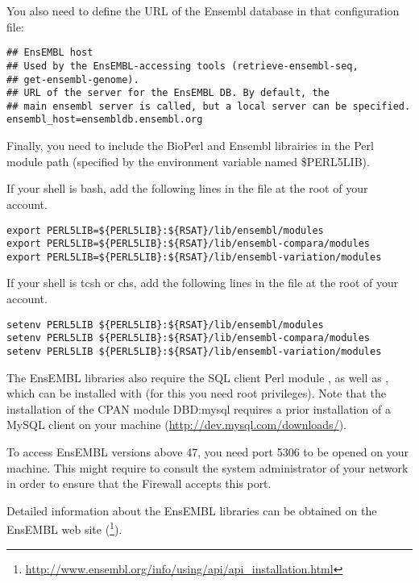 \documentclass[12pt,a4paper, oneside]{scrreprt} %
\begin{document}
You also need to define the URL of the Ensembl database in that
configuration file:

\begin{lstlisting}
## EnsEMBL host
## Used by the EnsEMBL-accessing tools (retrieve-ensembl-seq,
## get-ensembl-genome).
## URL of the server for the EnsEMBL DB. By default, the
## main ensembl server is called, but a local server can be specified.
ensembl_host=ensembldb.ensembl.org
\end{lstlisting}

Finally, you need to include the BioPerl and Ensembl librairies in the
Perl module path (specified by the environment variable named
\$PERL5LIB).

If your shell is bash, add the following lines in the file
 at the root of your account.

\begin{lstlisting}
export PERL5LIB=${PERL5LIB}:${RSAT}/lib/ensembl/modules
export PERL5LIB=${PERL5LIB}:${RSAT}/lib/ensembl-compara/modules
export PERL5LIB=${PERL5LIB}:${RSAT}/lib/ensembl-variation/modules
\end{lstlisting}

If your shell is tcsh or chs, add the following lines in the file
 at the root of your account.

\begin{lstlisting}
setenv PERL5LIB ${PERL5LIB}:${RSAT}/lib/ensembl/modules
setenv PERL5LIB ${PERL5LIB}:${RSAT}/lib/ensembl-compara/modules
setenv PERL5LIB ${PERL5LIB}:${RSAT}/lib/ensembl-variation/modules
\end{lstlisting}



The EnsEMBL libraries also require the SQL client Perl module
, as well as , which can be installed with
 (for this you need root privileges). Note that the
installation of the CPAN module DBD:mysql requires a prior
installation of a MySQL client on your machine
(\url{http://dev.mysql.com/downloads/}).

To access EnsEMBL versions above 47, you need port 5306 to be opened
on your machine. This might require to consult the system
administrator of your network in order to ensure that the Firewall
accepts this port.

Detailed information about the EnsEMBL libraries can be obtained on
the EnsEMBL web site
(\footnote{\url{http://www.ensembl.org/info/using/api/api\_installation.html}}).
\end{document}
